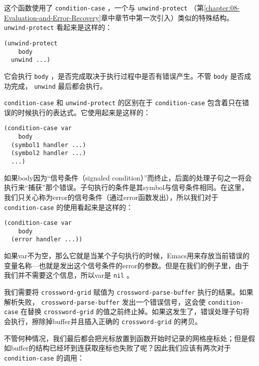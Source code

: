 这个函数使用了 \texttt{condition-case} ，一个与 \texttt{unwind-protect} （第\ref{chapter:08-Evaluation-and-Error-Recovery}章中章节中第一次引入）类似的特殊结构。 \texttt{unwind-protect} 看起来是这样的：

\begin{verbatim}
(unwind-protect
    body
  unwind ...)
\end{verbatim}

它会执行 \texttt{body} ，是否完成取决于执行过程中是否有错误产生。不管 \texttt{body} 是否成功完成， \texttt{unwind} 最后都会执行。

 \texttt{condition-case} 和 \texttt{unwind-protect} 的区别在于 \texttt{condition-case} 包含着只在错误的时候执行的表达式。它使用起来是这样的：

\begin{verbatim}
(condition-case var
    body
  (symbol1 handler ...)
  (symbol2 handler ...)
  ...)
\end{verbatim}

如果body因为“信号条件（signaled condition）”而终止，后面的处理子句之一将会执行来“捕获”那个错误。子句执行的条件是其symbol与信号条件相同。在这里，我们只关心称为error的信号条件（通过error函数发出），所以我们对于 \texttt{condition-case} 的使用看起来是这样的：

\begin{verbatim}
(condition-case var
    body
  (error handler ...))
\end{verbatim}

如果var不为空，那么它就是当某个子句执行的时候，Emacs用来存放当前错误的变量名称---也就是发出这个信号条件的error的参数。但是在我们的例子里，由于我们并不需要这个信息，所以var是 \texttt{nil} 。

我们需要将 \texttt{crossword-grid} 赋值为 \texttt{crossword-parse-buffer} 执行的结果。如果解析失败， \texttt{crossword-parse-buffer} 发出一个错误信号，这会使 \texttt{condition-case} 在替换 \texttt{crossword-grid} 的值之前终止掉。如果这发生了，错误处理子句将会执行，擦除掉buffer并且插入正确的 \texttt{crossword-grid} 的拷贝。

不管何种情况，我们最后都会把光标放置到函数开始时记录的网格座标处；但是假如buffer的结构已经坏到连获取座标也失败了呢？因此我们应该有两次对于 \texttt{condition-case} 的调用：

